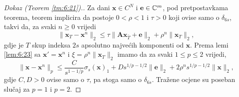 \documentclass[a4paper,twoside,12pt]{memoir} %
\newcommand{\vect}[1]{\mathbf{#1}}
\renewcommand{\vec}{\vect}
\newcommand{\norm}[1]{\|{#1}\|}
\begin{document}
\begin{proof}[Dokaz (Teorem \ref{tm:6:21}).]
    Za dani $\vec x \in C^N$ i $\vec e \in \C^m$, pod pretpostavkama teorema, teorem  implicira da postoje $0<\rho<1$ i $\tau > 0$ koji ovise samo o $\delta_{6s}$, takvi da, za svaki $n \geq 0$ vrijedi 
    \begin{equation*}
        \norm{\vec x_T - \vec x^n}_2 \leq \tau \norm{\vec{Ax}_{\bar T} + \vec e}_2 + \rho^n \norm{\vec x_T}_2,
    \end{equation*}
    gdje je $T$ skup indeksa $2s$ apsolutno najve\'cih komponenti od $\vec x$. Prema lemi \ref{lem:6:23} sa $\vec x' = \vec x^n$ i $\xi = \rho^n \norm{\vec x_T}_2$ imamo da za svaki $1 \leq p \leq 2$ vrijedi,
    \begin{equation*}
        \norm{\vec x - \vec x^n}_p \leq \frac{C}{s^{1-1/p}} \sigma_s(\vec x)_1 + D s^{1/p - 1/2} \norm{\vec e}_2 + 2 \rho^n s^{1/p - 1/2} \norm{\vec x}_2, 
    \end{equation*}
    gdje $C,D > 0$ ovise samo o $\tau$, pa stoga samo o $\delta_{6s}$. Tra\v{z}ene ocjene su poseban slu\v{c}aj za $p=1$ i $p=2$.
\end{proof}
\end{document}

